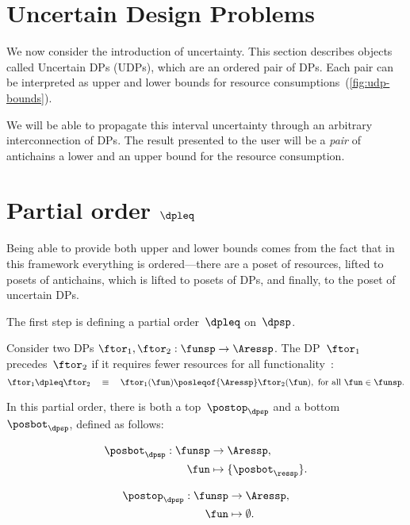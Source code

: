 \section{Uncertain Design Problems}
\label{sec:UDP}

We now consider the introduction of uncertainty.
This section describes
objects called Uncertain DPs (UDPs), which are an ordered pair of
DPs.
Each pair can be interpreted as upper and lower bounds for resource
consumptions~(\cref{fig:udp-bounds}).


We will be able to propagate this interval uncertainty through an
arbitrary interconnection of DPs.
The result presented to the user
will be a \emph{pair} of antichains \textemdash{} a lower and an upper
bound for the resource consumption.

\section{Partial order $\dpleq$}

Being able to provide both upper and lower bounds comes from the fact
that in this framework everything is ordered---there are
a poset of resources, lifted to posets of antichains, which is lifted
to posets of DPs, and finally, to the poset of uncertain DPs.

The first step is defining a partial order~$\dpleq$ on~$\dpsp$.
\begin{definition}
	Consider two DPs $\ftor_{1},\ftor_{2}:\funsp\rightarrow\Aressp$.
	The DP~$\ftor_{1}$ precedes~$\ftor_{2}$ if it requires fewer resources
	for all functionality~\fun:
	\[
		\ftor_{1}\dpleq\ftor_{2}\quad\equiv\quad\ftor_{1}(\fun)\posleqof{\Aressp}\ftor_{2}(\fun),\ \text{for all }\fun\in\funsp.
	\]
\end{definition}

In this partial order, there is both a top~$\postop_{\dpsp}$ and a
bottom~$\posbot_{\dpsp}$, defined as follows:

\vspace{-5mm}

\begin{minipage}[t]{0.4\columnwidth}
	\begin{align*}
		\posbot_{\dpsp}:\funsp & \rightarrow\Aressp,          \\
		\fun                   & \mapsto\{\posbot_{\ressp}\}.
	\end{align*}

\end{minipage}
\begin{minipage}[t]{0.4\columnwidth}
	\begin{align}
		\postop_{\dpsp}:\funsp & \rightarrow\Aressp,\nonumber    \\
		\fun                   & \mapsto\emptyset.\label{eq:top}
	\end{align}

\end{minipage}

